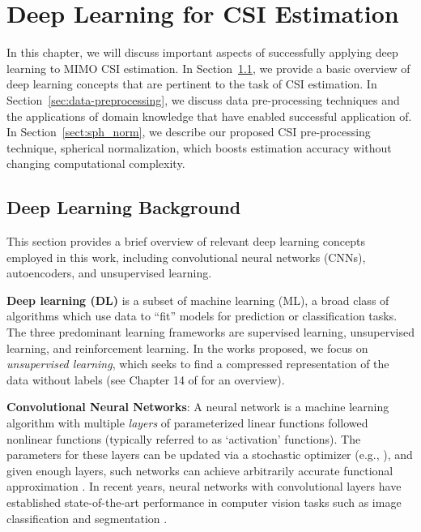 \chapter{Deep Learning for CSI Estimation}
\label{chap:sph_norm}

In this chapter, we will discuss important aspects of successfully applying deep learning to MIMO CSI estimation. In Section~\ref{sect:dl_overview}, we provide a basic overview of deep learning concepts that are pertinent to the task of CSI estimation. In Section~\ref{sec:data-preprocessing}, we discuss data pre-processing techniques and the applications of domain knowledge that have enabled successful application of. In Section~\ref{sect:sph_norm}, we describe our proposed CSI pre-processing technique, spherical normalization, which boosts estimation accuracy without changing computational complexity. 

\section{Deep Learning Background}
\label{sect:dl_overview}

This section provides a brief overview of relevant deep learning concepts employed in this work, including convolutional neural networks (CNNs), autoencoders, and unsupervised learning.

\textbf{Deep learning (DL)} is a subset of machine learning (ML), a broad class of algorithms which use data to ``fit'' models for prediction or classification tasks. The three predominant learning frameworks are supervised learning, unsupervised learning, and reinforcement learning. In the works proposed, we focus on \emph{unsupervised learning}, which seeks to find a compressed representation of the data without labels (see Chapter 14 of \cite{ref:Hastie2016Elements} for an overview).

\textbf{Convolutional Neural Networks}: A neural network is a machine learning algorithm with multiple \emph{layers} of parameterized linear functions followed nonlinear functions (typically referred to as `activation' functions). The parameters for these layers can be updated via a stochastic optimizer (e.g., \cite{ref:Kingma2014ADAM}), and given enough layers, such networks can achieve arbitrarily accurate functional approximation \cite{ref:Hecht1992TheoryBackprop}. In recent years, neural networks with convolutional layers have established state-of-the-art performance in computer vision tasks such as image classification \cite{ref:Sabour2017Dynamic} and segmentation \cite{ref:He2017Mask}.

